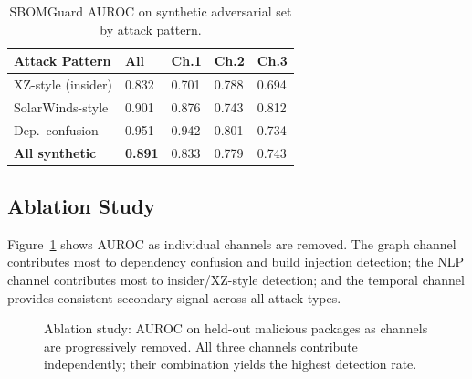\documentclass[sigconf,nonacm]{acmart}
\begin{document}
\begin{table}[h]
\caption{SBOMGuard AUROC on synthetic adversarial set by attack pattern.}
\label{tab:adv_results}
\small
\begin{tabularx}{\columnwidth}{@{}p{3.0cm}p{0.85cm}p{0.85cm}p{0.85cm}p{0.95cm}@{}}
\toprule
\textbf{Attack Pattern} & \textbf{All} & \textbf{Ch.1} & \textbf{Ch.2} & \textbf{Ch.3} \\
\midrule
XZ-style (insider) & 0.832 & 0.701 & 0.788 & 0.694 \\
SolarWinds-style & 0.901 & 0.876 & 0.743 & 0.812 \\
Dep.~confusion & 0.951 & 0.942 & 0.801 & 0.734 \\
\textbf{All synthetic} & \textbf{0.891} & 0.833 & 0.779 & 0.743 \\
\bottomrule
\end{tabularx}
\end{table}

\subsection{Ablation Study}

Figure~\ref{fig:ablation} shows AUROC as individual channels are removed. The
graph channel contributes most to dependency confusion and build injection
detection; the NLP channel contributes most to insider/XZ-style detection; and
the temporal channel provides consistent secondary signal across all attack types.

\begin{figure}[h]
\centering
{}
\caption{Ablation study: AUROC on held-out malicious packages as channels are
  progressively removed. All three channels contribute independently; their
  combination yields the highest detection rate.}
\label{fig:ablation}
\end{figure}
\end{document}
